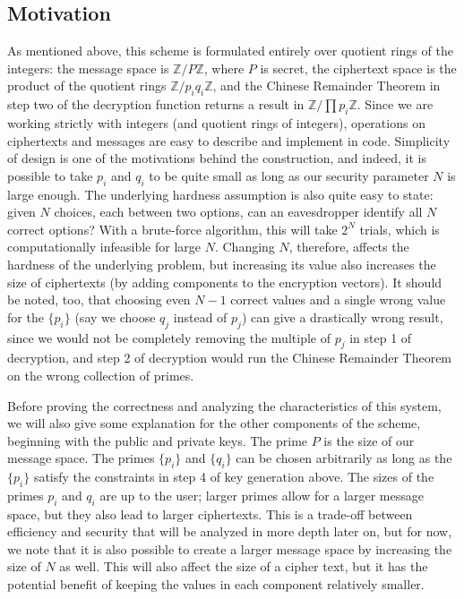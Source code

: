 \documentclass[11pt]{report}
\newcommand{\Z}{\mathbb{Z}}
\newcommand{\ZP}{\mathbb{Z}/P\mathbb{Z}}
\begin{document}
\subsection{Motivation}

As mentioned above, this scheme is formulated entirely over quotient rings of the integers: the message space is $\ZP$, where $P$ is secret, the ciphertext space is the product of the quotient rings $\Z/p_iq_i\Z$, and the Chinese Remainder Theorem in step two of the decryption function returns a result in $\Z/\prod p_i\Z$. Since we are working strictly with integers (and quotient rings of integers), operations on ciphertexts and messages are easy to describe and implement in code. Simplicity of design is one of the motivations behind the construction, and indeed, it is possible to take $p_i$ and $q_i$ to be quite small as long as our security parameter $N$ is large enough. The underlying hardness assumption is also quite easy to state: given $N$ choices, each between two options, can an eavesdropper identify all $N$ correct options? With a brute-force algorithm, this will take $2^N$ trials, which is computationally infeasible for large $N$. Changing $N$, therefore, affects the hardness of the underlying problem, but increasing its value also increases the size of ciphertexts (by adding components to the encryption vectors). It should be noted, too, that choosing even $N-1$ correct values and a single wrong value for the $\{p_i\}$ (say we choose $q_j$ instead of $p_j$) can give a drastically wrong result, since we would not be completely removing the multiple of $p_j$ in step 1 of decryption, and step 2 of decryption would run the Chinese Remainder Theorem on the wrong collection of primes.

Before proving the correctness and analyzing the characteristics of this system, we will also give some explanation for the other components of the scheme, beginning with the public and private keys. The prime $P$ is the size of our message space. The primes $\{p_i\}$ and $\{q_i\}$ can be chosen arbitrarily as long as the $\{p_i\}$ satisfy the constraints in step 4 of key generation above. The sizes of the primes $p_i$ and $q_i$ are up to the user; larger primes allow for a larger message space, but they also lead to larger ciphertexts. This is a trade-off between efficiency and security that will be analyzed in more depth later on, but for now, we note that it is also possible to create a larger message space by increasing the size of $N$ as well. This will also affect the size of a cipher text, but it has the potential benefit of keeping the values in each component relatively smaller.
\end{document}
